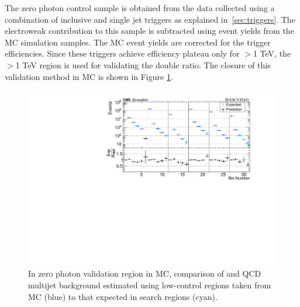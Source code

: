 The zero photon control sample is obtained from the data collected using a combination of inclusive \HT and single jet triggers as explained in~\ref{sec:triggers}. The electroweak contribution to this sample is subtracted using event yields from the MC simulation samples. The MC event yields are corrected for the trigger efficiencies. Since these triggers achieve efficiency plateau only for \HT$>$1 TeV, the \HT$>$1 TeV region is used for validating the double ratio. The closure of this validation method in MC is shown in Figure \ref{fig:no_photon_closure}. 
\begin{figure}[h!]
\centering
\includegraphics[width=0.85\linewidth]{../Figures/Chap3/SUSY_Photon_MET_JbJ_18Aug17/FakeMET/doubleR_ST1000.pdf}
\caption{In zero photon validation region in MC, comparison of \gjets and QCD multijet background estimated using low-\dphi control regions taken from MC (blue) to that expected in search regions (cyan).}
\label{fig:no_photon_closure}
\end{figure}

